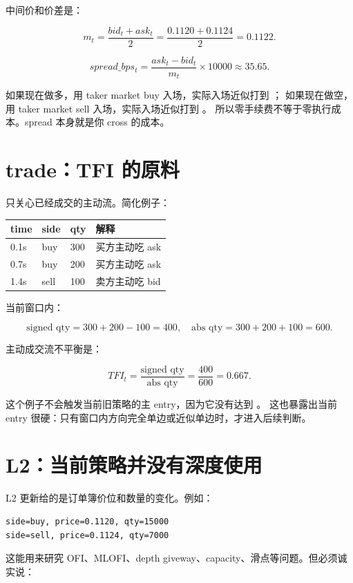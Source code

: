 中间价和价差是：

\[
m_t = \frac{bid_t + ask_t}{2}
    = \frac{0.1120 + 0.1124}{2}
    = 0.1122.
\]

\[
spread\_bps_t
= \frac{ask_t - bid_t}{m_t} \times 10000
\approx 35.65.
\]

如果现在做多，用 taker market buy 入场，实际入场近似打到 ；
如果现在做空，用 taker market sell 入场，实际入场近似打到 。
所以零手续费不等于零执行成本。spread 本身就是你 cross 的成本。

\section{trade：TFI 的原料}

 只关心已经成交的主动流。简化例子：

\begin{longtable}{p{}p{}p{}p{}}
\toprule
time & side & qty & 解释 \\
\midrule
0.1s & buy & 300 & 买方主动吃 ask \\
0.7s & buy & 200 & 买方主动吃 ask \\
1.4s & sell & 100 & 卖方主动吃 bid \\
\bottomrule
\end{longtable}

当前窗口内：

\[
\text{signed qty} = 300 + 200 - 100 = 400,
\quad
\text{abs qty} = 300 + 200 + 100 = 600.
\]

主动成交流不平衡是：

\[
TFI_t = \frac{\text{signed qty}}{\text{abs qty}}
      = \frac{400}{600}
      = 0.667.
\]

这个例子不会触发当前旧策略的主 entry，因为它没有达到 。
这也暴露出当前 entry 很硬：只有窗口内方向完全单边或近似单边时，才进入后续判断。

\section{L2：当前策略并没有深度使用}

L2 更新给的是订单簿价位和数量的变化。例如：

\begin{lstlisting}
side=buy, price=0.1120, qty=15000
side=sell, price=0.1124, qty=7000
\end{lstlisting}

这能用来研究 OFI、MLOFI、depth giveway、capacity、滑点等问题。但必须诚实说：

